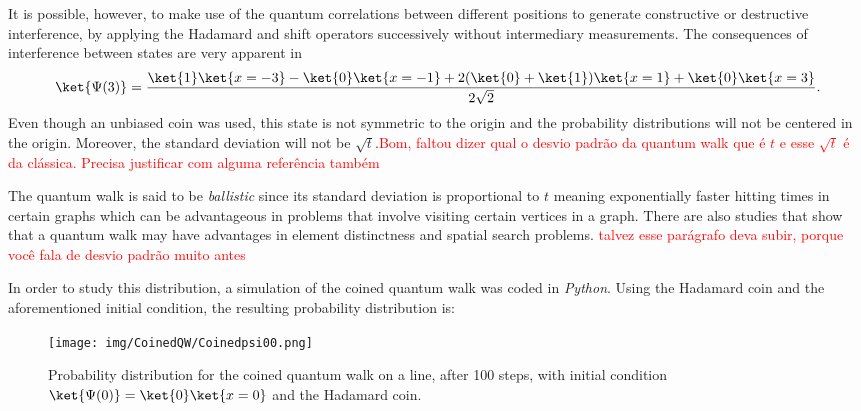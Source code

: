                 It is possible, however, to make use of the quantum correlations between different positions to generate constructive or destructive  interference, by applying the Hadamard and shift operators successively without intermediary measurements.
                The consequences of interference between states are very apparent in
                \begin{equation}
                    \ket{\Psi(3)} = \frac{\ket{1}\ket{x=-3}-\ket{0}\ket{x=-1}+2(\ket{0}+\ket{1})\ket{x=1}+\ket{0}\ket{x=3}}{2\sqrt{2}}\label{eq:12}.
                \end{equation}
                Even though an unbiased coin was used, this state is not symmetric to the origin and the probability distributions will not be centered in the origin. Moreover, the standard deviation will not be $\sqrt{t}$.\textcolor{red}{Bom, faltou dizer qual o desvio padrão da quantum walk que é $t$ e esse $\sqrt{t}$ é da clássica. Precisa justificar com alguma referência também}\par
                The quantum walk is said to be \textit{ballistic} since its standard deviation is proportional to $t$ \cite{andraca2012} meaning exponentially faster hitting times in certain graphs \cite{childs2002,fahri98} which can be advantageous in problems that involve visiting certain vertices in a graph. There are also studies that show that a quantum walk may have advantages in element distinctness \cite{ambainis2003} and spatial search \cite{childs2004} problems. \textcolor{red}{talvez esse parágrafo deva subir, porque você fala de desvio padrão muito antes}
                
    	        In order to study this distribution, a simulation of the coined quantum walk was coded in \textit{Python}. Using the Hadamard coin and the aforementioned initial condition, the resulting probability distribution is:
    	        
    	        \begin{figure}[!h]
                    \centering
                    \texttt{[image: img/CoinedQW/Coinedpsi00.png]}
                    \caption{Probability distribution for the coined quantum walk on a line, after 100 steps, with initial condition $\ket{\Psi(0)}=\ket{0}\ket{x=0}$ and the Hadamard coin.} 
                    \label{fig:fig1}
                \end{figure}
                
